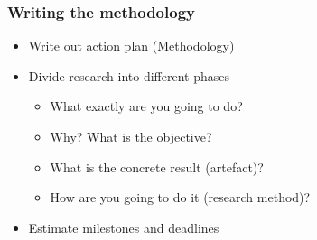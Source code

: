 \documentclass[aspectratio=169]{beamer}
\begin{document}
\begin{frame}
  \frametitle{Writing the methodology}

  \begin{itemize}
    \item Write out action plan (Methodology)
    \item Divide research into different phases
          \begin{itemize}
            \item What exactly are you going to do?
            \item Why? What is the objective?
            \item What is the concrete result (artefact)?
            \item How are you going to do it (research method)?
          \end{itemize}
    \item Estimate milestones and deadlines
  \end{itemize}

\end{frame}
\end{document}
